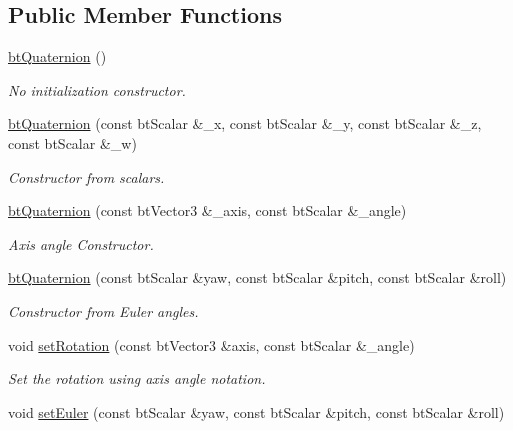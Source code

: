 \subsection*{Public Member Functions}
\begin{DoxyCompactItemize}
\item 
\mbox{\label{classbtQuaternion_a3b5e50d610ee8cdda2aa78e092825675}} 
\hyperlink{classbtQuaternion_a3b5e50d610ee8cdda2aa78e092825675}{bt\+Quaternion} ()
\begin{DoxyCompactList}\small\item\em No initialization constructor. \end{DoxyCompactList}\item 
\mbox{\label{classbtQuaternion_a6a50bf861ae5fa4ad5ea2b7da231847c}} 
\hyperlink{classbtQuaternion_a6a50bf861ae5fa4ad5ea2b7da231847c}{bt\+Quaternion} (const bt\+Scalar \&\+\_\+x, const bt\+Scalar \&\+\_\+y, const bt\+Scalar \&\+\_\+z, const bt\+Scalar \&\+\_\+w)
\begin{DoxyCompactList}\small\item\em Constructor from scalars. \end{DoxyCompactList}\item 
\hyperlink{classbtQuaternion_a2b2e9ed0014eb26ed076808fb76e9d69}{bt\+Quaternion} (const bt\+Vector3 \&\+\_\+axis, const bt\+Scalar \&\+\_\+angle)
\begin{DoxyCompactList}\small\item\em Axis angle Constructor. \end{DoxyCompactList}\item 
\hyperlink{classbtQuaternion_a8bd5d699377ba585749d325076616ffb}{bt\+Quaternion} (const bt\+Scalar \&yaw, const bt\+Scalar \&pitch, const bt\+Scalar \&roll)
\begin{DoxyCompactList}\small\item\em Constructor from Euler angles. \end{DoxyCompactList}\item 
void \hyperlink{classbtQuaternion_ade840b704d06ad0092b996b432b8a8a6}{set\+Rotation} (const bt\+Vector3 \&axis, const bt\+Scalar \&\+\_\+angle)
\begin{DoxyCompactList}\small\item\em Set the rotation using axis angle notation. \end{DoxyCompactList}\item 
void \hyperlink{classbtQuaternion_aed0a6469d6c6c1e379f1143ad62b3439}{set\+Euler} (const bt\+Scalar \&yaw, const bt\+Scalar \&pitch, const bt\+Scalar \&roll)

\end{DoxyCompactItemize}
